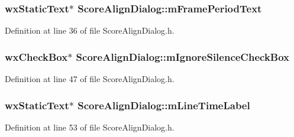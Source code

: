 \subsubsection[{\texorpdfstring{m\+Frame\+Period\+Text}{mFramePeriodText}}]{\setlength{\rightskip}{0pt plus 5cm}wx\+Static\+Text$\ast$ Score\+Align\+Dialog\+::m\+Frame\+Period\+Text}\hypertarget{class_score_align_dialog_a05c2a0ba15968eac2f0ed4d6540c8dad}{}\label{class_score_align_dialog_a05c2a0ba15968eac2f0ed4d6540c8dad}


Definition at line 36 of file Score\+Align\+Dialog.\+h.

\subsubsection[{\texorpdfstring{m\+Ignore\+Silence\+Check\+Box}{mIgnoreSilenceCheckBox}}]{\setlength{\rightskip}{0pt plus 5cm}wx\+Check\+Box$\ast$ Score\+Align\+Dialog\+::m\+Ignore\+Silence\+Check\+Box}\hypertarget{class_score_align_dialog_ac0a9f12b9c2fcb9d13923b94fed1ea71}{}\label{class_score_align_dialog_ac0a9f12b9c2fcb9d13923b94fed1ea71}


Definition at line 47 of file Score\+Align\+Dialog.\+h.

\subsubsection[{\texorpdfstring{m\+Line\+Time\+Label}{mLineTimeLabel}}]{\setlength{\rightskip}{0pt plus 5cm}wx\+Static\+Text$\ast$ Score\+Align\+Dialog\+::m\+Line\+Time\+Label}\hypertarget{class_score_align_dialog_ab73b0cb34c95002944e2d0a3253b5f47}{}\label{class_score_align_dialog_ab73b0cb34c95002944e2d0a3253b5f47}


Definition at line 53 of file Score\+Align\+Dialog.\+h.

